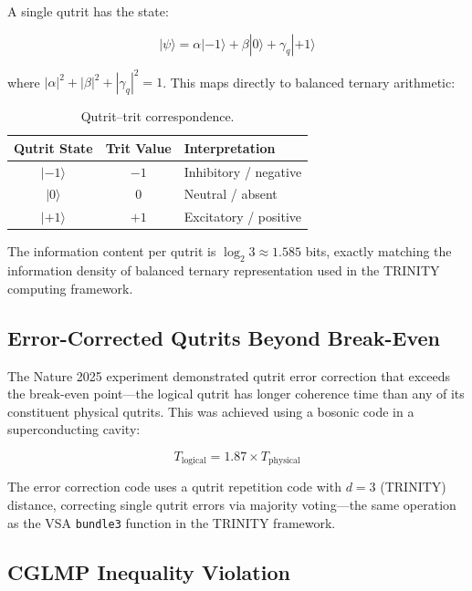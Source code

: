 \documentclass[12pt,a4paper]{article}
\begin{document}
A single qutrit has the state:

\begin{equation}
|\psi\rangle = \alpha|{-1}\rangle + \beta|{0}\rangle + \gamma_q|{+1}\rangle
\label{eq:qutrit}
\end{equation}

\noindent
where $|\alpha|^2 + |\beta|^2 + |\gamma_q|^2 = 1$. This maps directly to
balanced ternary arithmetic:

\begin{table}[h!]
\centering
\caption{Qutrit--trit correspondence.}
\label{tab:qutrit_trit}
\begin{tabular}{@{}ccl@{}}
\toprule
\textbf{Qutrit State} & \textbf{Trit Value} & \textbf{Interpretation} \\
\midrule
$|{-1}\rangle$ & $-1$ & Inhibitory / negative \\
$|0\rangle$ & $0$ & Neutral / absent \\
$|{+1}\rangle$ & $+1$ & Excitatory / positive \\
\bottomrule
\end{tabular}
\end{table}

The information content per qutrit is $\log_2 3 \approx 1.585$ bits, exactly
matching the information density of balanced ternary representation used in
the TRINITY computing framework.

\subsection{Error-Corrected Qutrits Beyond Break-Even}

The Nature 2025 experiment \cite{Nature2025Qutrits} demonstrated qutrit error
correction that exceeds the break-even point---the logical qutrit has longer
coherence time than any of its constituent physical qutrits. This was achieved
using a bosonic code in a superconducting cavity:

\begin{equation}
T_{\mathrm{logical}} = 1.87 \times T_{\mathrm{physical}}
\end{equation}

\noindent
The error correction code uses a qutrit repetition code with $d = 3$
(TRINITY) distance, correcting single qutrit errors via majority voting---the
same operation as the VSA \texttt{bundle3} function in the TRINITY framework.

\subsection{CGLMP Inequality Violation}
\end{document}

